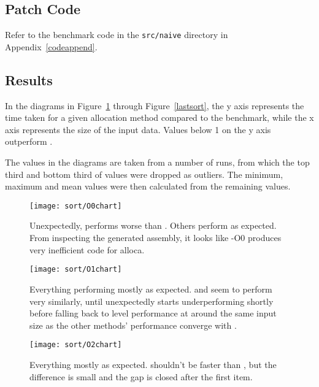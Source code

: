 \subsection{Patch Code}

Refer to the benchmark code in the \texttt{src/naive} directory in Appendix~\ref{codeappend}.

\subsection{Results}

In the diagrams in Figure~\ref{firstsort} through Figure~\ref{lastsort}, the y axis represents the time taken for a given allocation method compared to the  benchmark, while the x axis represents the size of the input data. Values below 1 on the y axis outperform \malloc{}.

The values in the diagrams are taken from a number of runs, from which the top third and bottom third of values were dropped as outliers. The minimum, maximum and mean values were then calculated from the remaining values.

\begin{figure}[ph]
	\centering
	\texttt{[image: sort/O0chart]}
	\caption{Unexpectedly,  performs worse than . Others perform as expected. From inspecting the generated assembly, it looks like -O0 produces very inefficient code for alloca.}\label{firstsort}
\end{figure}

\begin{figure}[ph]
	\centering
	\texttt{[image: sort/O1chart]}
	\caption{Everything performing mostly as expected.  and  seem to perform very similarly, until  unexpectedly starts underperforming  shortly before falling back to  level performance at around the same input size as the other methods' performance converge with .}
\end{figure}

\begin{figure}[ph]
	\centering
	\texttt{[image: sort/O2chart]}
	\caption{Everything mostly as expected.  shouldn't be faster than , but the difference is small and the gap is closed after the first item.}
\end{figure}

